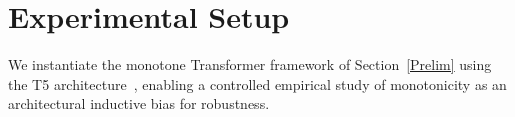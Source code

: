 \documentclass{article}
\theoremstyle{plain}
\theoremstyle{definition}
\newtheorem{definition}[theorem]{Definition}
\theoremstyle{remark}
\begin{document}

% 



\section{Experimental Setup}
We instantiate the monotone Transformer framework of Section~\ref{Prelim} using the T5 architecture~\citep{raffel2020exploring}, enabling a controlled empirical study of monotonicity as an architectural inductive bias for robustness.
\end{document}
